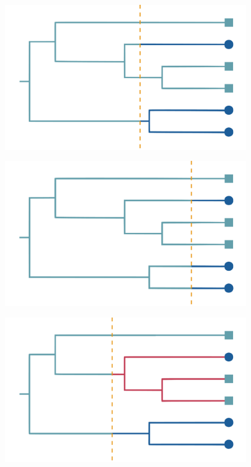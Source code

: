 \documentclass[aspectratio=169]{beamer}
\begin{document}
\begin{frame}

    \begin{center}

        \centering\includegraphics[width=0.8\textwidth]{images/tree-option1}
        
    \end{center}

\end{frame}


\begin{frame}

    \begin{center}

        \centering\includegraphics[width=0.8\textwidth]{images/tree-option2}

    \end{center}

\end{frame}


\begin{frame}

    \begin{center}

        \centering\includegraphics[width=0.8\textwidth]{images/tree-option3}

    \end{center}

\end{frame}
\end{document}
